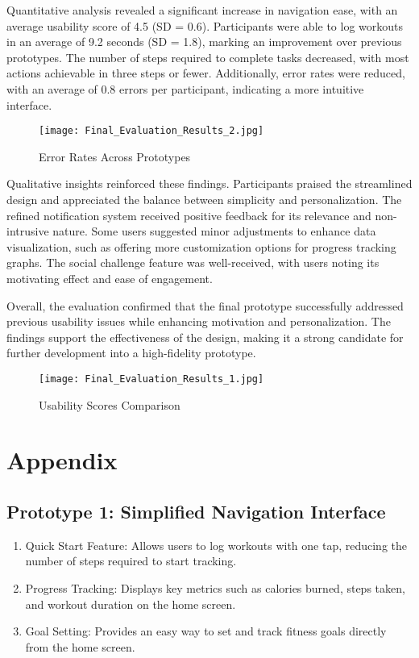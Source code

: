 \documentclass[
	letterpaper, %
]{jdf}
\begin{document}
Quantitative analysis revealed a significant increase in navigation ease, with an average usability score of 4.5 (SD = 0.6). Participants were able to log workouts in an average of 9.2 seconds (SD = 1.8), marking an improvement over previous prototypes. The number of steps required to complete tasks decreased, with most actions achievable in three steps or fewer. Additionally, error rates were reduced, with an average of 0.8 errors per participant, indicating a more intuitive interface.

\begin{figure}
    \centering
    \texttt{[image: Final\_Evaluation\_Results\_2.jpg]}
    \caption{Error Rates Across Prototypes}
    \label{fig:enter-label}
\end{figure}

Qualitative insights reinforced these findings. Participants praised the streamlined design and appreciated the balance between simplicity and personalization. The refined notification system received positive feedback for its relevance and non-intrusive nature. Some users suggested minor adjustments to enhance data visualization, such as offering more customization options for progress tracking graphs. The social challenge feature was well-received, with users noting its motivating effect and ease of engagement.

Overall, the evaluation confirmed that the final prototype successfully addressed previous usability issues while enhancing motivation and personalization. The findings support the effectiveness of the design, making it a strong candidate for further development into a high-fidelity prototype.

\begin{figure}
    \centering
    \texttt{[image: Final\_Evaluation\_Results\_1.jpg]}
    \caption{Usability Scores Comparison}
    \label{fig:enter-label}
\end{figure}

\newpage
\newpage
\section{Appendix}
\subsection{Prototype 1: Simplified Navigation Interface}
\begin{enumerate}
        \item Quick Start Feature: Allows users to log workouts with one tap, reducing the number of steps required to start tracking.
        \item Progress Tracking: Displays key metrics such as calories burned, steps taken, and workout duration on the home screen.
        \item Goal Setting: Provides an easy way to set and track fitness goals directly from the home screen.
\end{enumerate}
\end{document}
